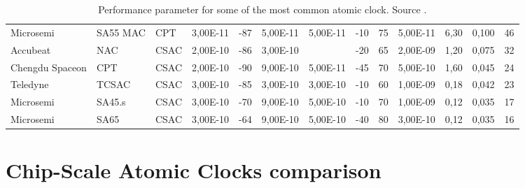 \begin{table}[H]
{\begin{tabular}{ll|lllllllllll}
            Microsemi       & SA55 MAC         & CPT           & 3,00E-11      & -87                    & 5,00E-11       & 5,00E-11         & -10                    & 75                     & 5,00E-11        & 6,30           & 0,100           & 46                      \\
            Accubeat        & NAC              & CSAC          & 2,00E-10      & -86                    & 3,00E-10       & ~                & -20                    & 65                     & 2,00E-09        & 1,20           & 0,075           & 32                      \\
            Chengdu Spaceon & CPT              & CSAC          & 2,00E-10      & -90                    & 9,00E-10       & 5,00E-11         & -45                    & 70                     & 5,00E-10        & 1,60           & 0,045           & 24                      \\
            Teledyne        & TCSAC            & CSAC          & 3,00E-10      & -85                    & 3,00E-10       & 3,00E-10         & -10                    & 60                     & 1,00E-09        & 0,18           & 0,042           & 23                      \\
            Microsemi       & SA45.s           & CSAC          & 3,00E-10      & -70                    & 9,00E-10       & 5,00E-10         & -10                    & 70                     & 1,00E-09        & 0,12           & 0,035           & 17                      \\
            Microsemi       & SA65             & CSAC          & 3,00E-10      & -64                    & 9,00E-10       & 5,00E-10         & -40                    & 80                     & 3,00E-10        & 0,12           & 0,035           & 16                      \\
            \hline
        \end{tabular}
    }
    \caption{Performance parameter for some of the most common atomic clock. Source \cite{Marlow-Scherer}.}
\end{table}

\eject
\restoregeometry
\pdfpagewidth=210mm
\pdfpageheight=297mm


\section*{Chip-Scale Atomic Clocks comparison}
\label{appendix:csac}

